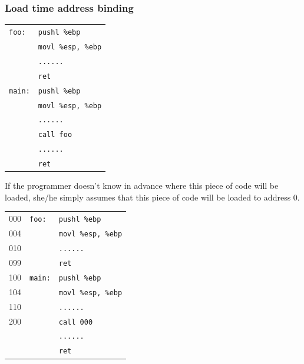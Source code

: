 \documentclass[CJKutf8,xcolor=pdftex,dvipsnames,table]{beamer}
\begin{document}
\begin{CJK*}{UTF8}{song}
  \begin{frame}[fragile]
    \frametitle{Load time address binding} \pause
    \begin{minipage}[c]{0.3\textwidth}
      \small
      \begin{tabular}{ll}
        \verb=foo:= & \verb=pushl %ebp=\\
        & \verb=movl %esp, %ebp=\\
        & \verb=......=\\
        & \verb=ret=\\
        \verb=main:=& \verb=pushl %ebp=\\
        & \verb=movl %esp, %ebp=\\
        & \verb=......=\\
        & \verb=call foo=\\
        & \verb=......=\\
        & \verb=ret=
      \end{tabular} \pause
      \normalsize
    \end{minipage}%
    \begin{minipage}[c]{0.3\textwidth}
      \small
      If the programmer doesn't know in advance where this piece of code will be loaded, she/he simply assumes that this piece of code will be loaded to address 0. \pause
      \normalsize
    \end{minipage}%
    \begin{minipage}[c]{0.4\textwidth}
      \small
      \begin{tabular}{lll}
        000 & \verb=foo:= & \verb=pushl %ebp=\\
        004 &              & \verb=movl %esp, %ebp=\\
        010 &              & \verb=......=\\
        099 &              & \verb=ret=\\
        100 & \verb=main:=& \verb=pushl %ebp=\\
        104 &              & \verb=movl %esp, %ebp=\\
        110 &              & \verb=......=\\
        200 &              & \verb=call 000=\\
        &              & \verb=......=\\
        &              & \verb=ret=
      \end{tabular} \pause
      \normalsize
    \end{minipage}
    \begin{itemize}

\end{itemize}
\end{frame}
\end{CJK*}
\end{document}
